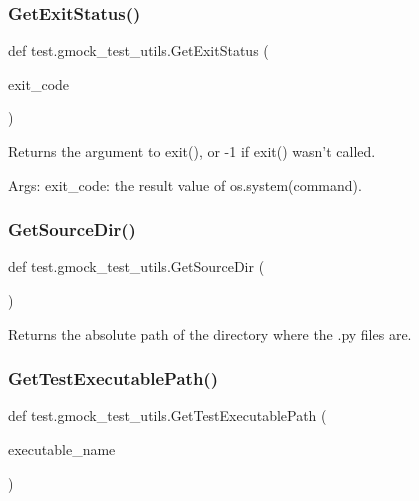 \subsubsection{\texorpdfstring{GetExitStatus()}{GetExitStatus()}}
{\footnotesize\ttfamily def test.\+gmock\+\_\+test\+\_\+utils.\+Get\+Exit\+Status (\begin{DoxyParamCaption}\item[{}]{exit\+\_\+code }\end{DoxyParamCaption})}

\begin{DoxyVerb}Returns the argument to exit(), or -1 if exit() wasn't called.

Args:
  exit_code: the result value of os.system(command).
\end{DoxyVerb}
 \mbox{\label{namespacetest_1_1gmock__test__utils_a7d61daab1cfc01ded5e90e580cd70c51}} 
\subsubsection{\texorpdfstring{GetSourceDir()}{GetSourceDir()}}
{\footnotesize\ttfamily def test.\+gmock\+\_\+test\+\_\+utils.\+Get\+Source\+Dir (\begin{DoxyParamCaption}{ }\end{DoxyParamCaption})}

\begin{DoxyVerb}Returns the absolute path of the directory where the .py files are.\end{DoxyVerb}
 \mbox{\label{namespacetest_1_1gmock__test__utils_a2e91ced571e7f160fc151c2378d8f2f1}} 
\subsubsection{\texorpdfstring{GetTestExecutablePath()}{GetTestExecutablePath()}}
{\footnotesize\ttfamily def test.\+gmock\+\_\+test\+\_\+utils.\+Get\+Test\+Executable\+Path (\begin{DoxyParamCaption}\item[{}]{executable\+\_\+name }\end{DoxyParamCaption})}


